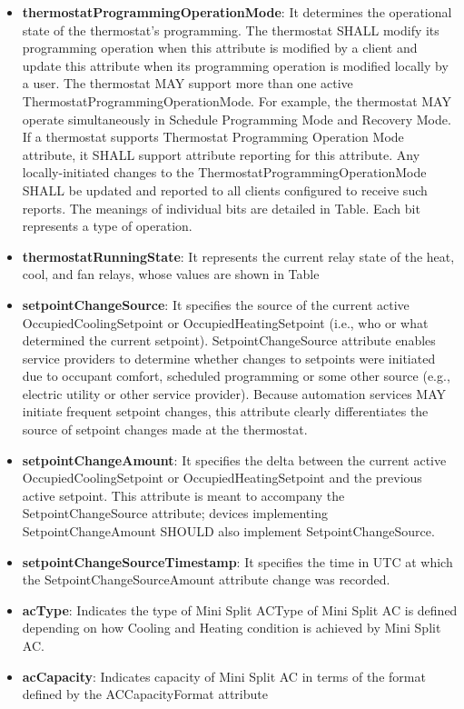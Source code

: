 \begin{itemize}
\item \textbf{thermostatProgrammingOperationMode}: It determines the operational state of the thermostat’s programming. The thermostat SHALL modify its programming operation when this attribute is modified by a client and update this attribute when its programming operation is modified locally by a user. The thermostat MAY support more than one active ThermostatProgrammingOperationMode. For example, the thermostat MAY operate simultaneously in Schedule Programming Mode and Recovery Mode. If a thermostat supports Thermostat Programming Operation Mode attribute, it SHALL support attribute reporting for this attribute. Any locally-initiated changes to the ThermostatProgrammingOperationMode SHALL be updated and reported to all clients configured to receive such reports. The meanings of individual bits are detailed in Table. Each bit represents a type of operation.
\item \textbf{thermostatRunningState}: It represents the current relay state of the heat, cool, and fan relays, whose values are shown in Table
\item \textbf{setpointChangeSource}: It  specifies the source of the current active OccupiedCoolingSetpoint or OccupiedHeatingSetpoint (i.e., who or what determined the current setpoint). SetpointChangeSource attribute enables service providers to determine whether changes to setpoints were initiated due to occupant comfort, scheduled programming or some other source (e.g., electric utility or other service provider). Because automation services MAY initiate frequent setpoint changes, this attribute clearly differentiates the source of setpoint changes made at the thermostat.
\item \textbf{setpointChangeAmount}: It specifies the delta between the current active OccupiedCoolingSetpoint or OccupiedHeatingSetpoint and the previous active setpoint. This attribute is meant to accompany the SetpointChangeSource attribute; devices implementing SetpointChangeAmount SHOULD also implement SetpointChangeSource.
\item \textbf{setpointChangeSourceTimestamp}: It specifies the time in UTC at which the SetpointChangeSourceAmount attribute change was recorded.
\item \textbf{acType}: Indicates the type of Mini Split ACType of Mini Split AC is defined depending on how Cooling and Heating condition is achieved by Mini Split AC.
\item \textbf{acCapacity}: Indicates capacity of Mini Split AC in terms of the format defined by the ACCapacityFormat attribute

\end{itemize}
